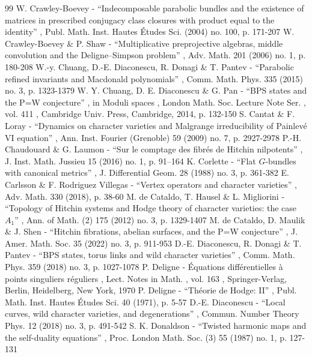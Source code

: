 \documentclass[11pt]{article}
\theoremstyle{definition}
\theoremstyle{plain}
\begin{document}
\begin{thebibliography}{99}
 W. Crawley-Boevey - “Indecomposable parabolic bundles and the existence of matrices in prescribed conjugacy class closures with product equal to the identity” , Publ. Math. Inst. Hautes Études Sci. (2004) no. 100, p. 171-207
 W. Crawley-Boevey \& P. Shaw - “Multiplicative preprojective algebras, middle convolution and the Deligne–Simpson problem” , Adv. Math. 201 (2006) no. 1, p. 180-208
 W.-y. Chuang, D.-E. Diaconescu, R. Donagi \& T. Pantev - “Parabolic refined invariants and Macdonald polynomials” , Comm. Math. Phys. 335 (2015) no. 3, p. 1323-1379
 W. Y. Chuang, D. E. Diaconescu \& G. Pan - “BPS states and the P=W conjecture” , in Moduli spaces , London Math. Soc. Lecture Note Ser. , vol. 411 , Cambridge Univ. Press, Cambridge, 2014, p. 132-150
 S. Cantat \& F. Loray - “Dynamics on character varieties and Malgrange irreducibility of Painlevé VI equation” , Ann. Inst. Fourier (Grenoble) 59 (2009) no. 7, p. 2927-2978
 P.-H. Chaudouard \& G. Laumon - “Sur le comptage des fibrés de Hitchin nilpotents” , J. Inst. Math. Jussieu 15 (2016) no. 1, p. 91–164
 K. Corlette - “Flat $G$-bundles with canonical metrics” , J. Differential Geom. 28 (1988) no. 3, p. 361-382
 E. Carlsson \& F. Rodriguez Villegas - “Vertex operators and character varieties” , Adv. Math. 330 (2018), p. 38-60
 M. de Cataldo, T. Hausel \& L. Migliorini - “Topology of Hitchin systems and Hodge theory of character varieties: the case $A_1$” , Ann. of Math. (2) 175 (2012) no. 3, p. 1329-1407
 M. de Cataldo, D. Maulik \& J. Shen - “Hitchin fibrations, abelian surfaces, and the P=W conjecture” , J. Amer. Math. Soc. 35 (2022) no. 3, p. 911-953
 D.-E. Diaconescu, R. Donagi \& T. Pantev - “BPS states, torus links and wild character varieties” , Comm. Math. Phys. 359 (2018) no. 3, p. 1027-1078
 P. Deligne - Équations différentielles à points singuliers réguliers , Lect. Notes in Math. , vol. 163 , Springer-Verlag, Berlin, Heidelberg, New York, 1970
 P. Deligne - “Théorie de Hodge: II” , Publ. Math. Inst. Hautes Études Sci. 40 (1971), p. 5-57
 D.-E. Diaconescu - “Local curves, wild character varieties, and degenerations” , Commun. Number Theory Phys. 12 (2018) no. 3, p. 491-542
 S. K. Donaldson - “Twisted harmonic maps and the self-duality equations” , Proc. London Math. Soc. (3) 55 (1987) no. 1, p. 127-131

\end{thebibliography}
\end{document}
